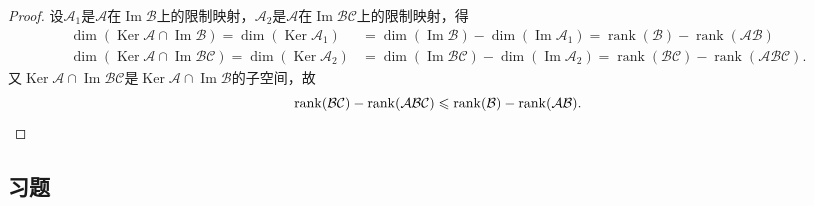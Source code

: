 \documentclass[a4paper,fontset=windows]{ctexbook}
\theoremstyle{definition}
\DeclareMathOperator{\im}{Im}
\DeclareMathOperator{\Ker}{Ker}
\DeclareMathOperator{\rank}{rank}
\renewcommand{\le}{\leqslant}
\begin{document}
\begin{proof}
设$\mathcal{A}_1$是$\mathcal{A}$在$\im\mathcal{B}$上的限制映射，$\mathcal{A}_2$是$\mathcal{A}$在$\im\mathcal{BC}$上的限制映射，得
\begin{align*}
\dim(\Ker\mathcal{A}\cap\im\mathcal{B})=\dim(\Ker\mathcal{A}_1)&=\dim(\im\mathcal{B})-\dim(\im\mathcal{A}_1)=\rank(\mathcal{B})-\rank(\mathcal{AB}) \\
\dim(\Ker\mathcal{A}\cap\im\mathcal{BC})=\dim(\Ker\mathcal{A}_2)&=\dim(\im\mathcal{BC})-\dim(\im\mathcal{A}_2)=\rank(\mathcal{BC})-\rank(\mathcal{ABC}).
\end{align*}
又$\Ker\mathcal{A}\cap\im\mathcal{BC}$是$\Ker\mathcal{A}\cap\im\mathcal{B}$的子空间，故
\begin{equation*}
\rank(\mathcal{BC})-\rank(\mathcal{ABC})\le\rank(\mathcal{B})-\rank(\mathcal{AB}).\qedhere
\end{equation*}
\end{proof}

\subsection*{习题}
\end{document}
